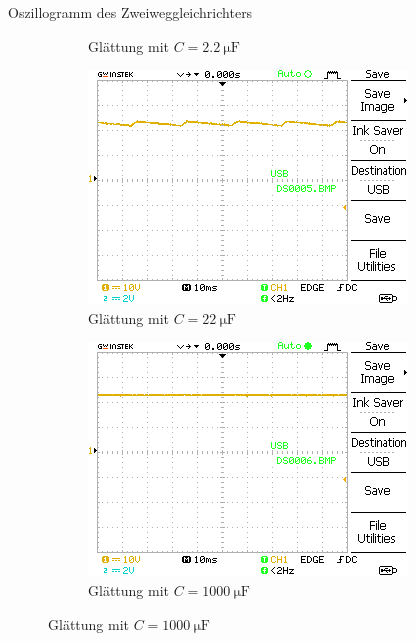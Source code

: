 \documentclass{article}
\theoremstyle{definition}
\begin{document}
\begin{aufgabe}{Oszillogramm des Zweiweggleichrichters}
\begin{figure}[H]
\begin{subfigure}[b]{0.49 \textwidth}
            \caption{Glättung mit $C = \SI{2.2}{\micro\farad}$}
            \label{a3_b}
        \end{subfigure}
        \vspace{1em}
        \begin{subfigure}[b]{0.49 \textwidth}
            \includegraphics[width=\textwidth]{MesswerteVersuch2/DS0005.png}
            \caption{Glättung mit $C = \SI{22}{\micro\farad}$}
            \label{a3_c}
        \end{subfigure}
        \hfill
        \begin{subfigure}[b]{0.49 \textwidth}
            \includegraphics[width=\textwidth]{MesswerteVersuch2/DS0006.png}
            \caption{Glättung mit $C = \SI{1000}{\micro\farad}$}
            \label{a3_d}

\end{subfigure}
\end{figure}
\end{aufgabe}
\end{document}
